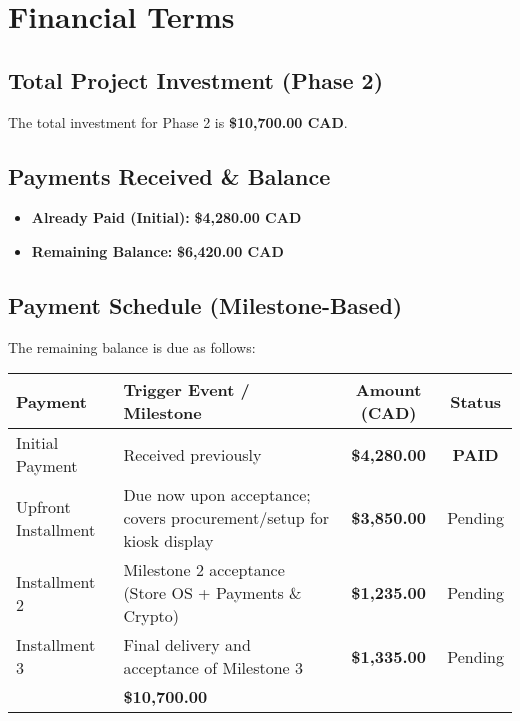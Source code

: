 \documentclass[11pt, a4paper]{article}
\begin{document}
\section{Financial Terms}
\subsection{Total Project Investment (Phase 2)}
The total investment for Phase 2 is \textbf{\$10{,}700.00 CAD}.

\subsection{Payments Received \& Balance}
\begin{itemize}
  \item \textbf{Already Paid (Initial):} \textbf{\$4{,}280.00 CAD}
  \item \textbf{Remaining Balance:} \textbf{\$6{,}420.00 CAD}
\end{itemize}

\subsection{Payment Schedule (Milestone-Based)}
The remaining balance is due as follows:
\begin{center}
\begin{tabular}{|l >{\raggedright\arraybackslash}p{7.2cm} c c|}
\hline
\rowcolor{lightgray}\textbf{Payment} & \textbf{Trigger Event / Milestone} & \textbf{Amount (CAD)} & \textbf{Status}\\
\hline
Initial Payment & Received previously & \textbf{\$4{,}280.00} & \textbf{PAID}\\
\hline
Upfront Installment & Due now upon acceptance; covers procurement/setup for kiosk display & \textbf{\$3{,}850.00} & Pending\\
\hline
Installment 2 & Milestone 2 acceptance (Store OS + Payments \& Crypto) & \textbf{\$1{,}235.00} & Pending\\
\hline
Installment 3 & Final delivery and acceptance of Milestone 3 & \textbf{\$1{,}335.00} & Pending\\
\hline
\rowcolor{lightgray}\multicolumn{2}{|r|}{\textbf{TOTAL PHASE 2}} & \textbf{\$10{,}700.00} & \\
\hline
\end{tabular}
\end{center}
\end{document}
